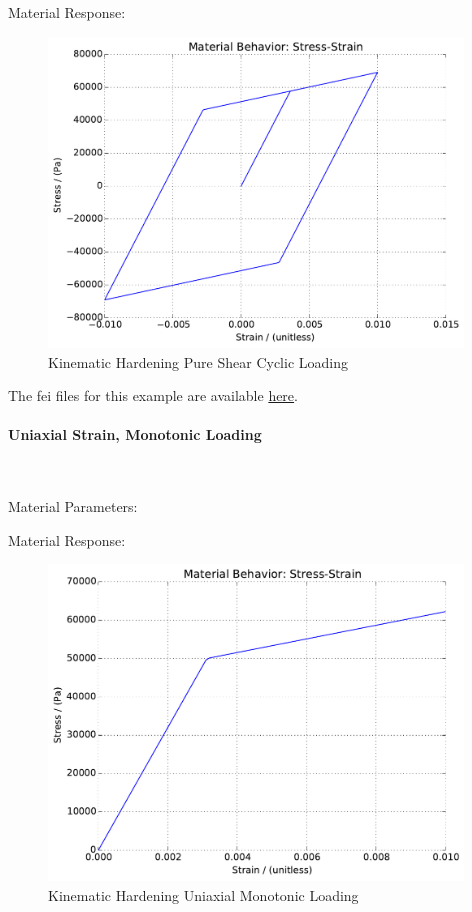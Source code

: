 \documentclass[fleqn,11pt]{article}
\begin{document}
Material Response:
\begin{figure}[H]
\begin{center}
\includegraphics[width=11cm]{../fei_examples/elastoplastic_kinematic_hardening/2pure_shear_cyclic_loading/result.pdf}
\caption{
\label{Kinematic Hardening Pure Shear Cyclic Loadin}
Kinematic Hardening Pure Shear Cyclic Loading}
\end{center}
\end{figure}

The fei files for this example are available \href{https://github.com/yuan-energy/education_examples/tree/master/fei_examples/kinematic_hardening_pure_shear_solid/2pure_shear_cyclic_loading}{here}.

\newpage
\paragraph{Uniaxial Strain, Monotonic Loading} ~

Material Parameters:


Material Response:
\begin{figure}[H]
\begin{center}
\includegraphics[width=11cm]{../fei_examples/elastoplastic_kinematic_hardening/3uniaxial_strain_mono_loading/result.pdf}
\caption{
\label{Kinematic Hardening Uniaxial Monotonic Loading}
Kinematic Hardening Uniaxial Monotonic Loading}
\end{center}
\end{figure}
\end{document}
